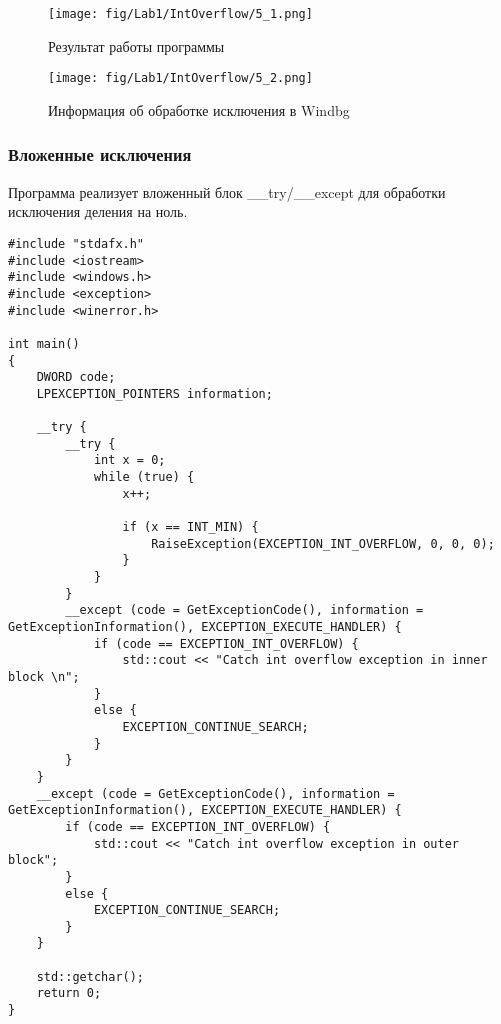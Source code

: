 \begin{figure}[H]
    \begin{center}
        \texttt{[image: fig/Lab1/IntOverflow/5\_1.png]}
        \caption{Результат работы программы}
        \label{pic:5_1}
    \end{center}
\end{figure}

\begin{figure}[H]
    \begin{center}
        \texttt{[image: fig/Lab1/IntOverflow/5\_2.png]}
        \caption{Информация об обработке исключения в Windbg}
        \label{pic:5_2}
    \end{center}
\end{figure}

\subsubsection{Вложенные исключения}
Программа реализует вложенный блок \_\_try/\_\_except для обработки исключения деления на ноль.

\begin{lstlisting}[caption=Вложенные исключения]
#include "stdafx.h"
#include <iostream>
#include <windows.h>
#include <exception>
#include <winerror.h>

int main()
{
    DWORD code;
    LPEXCEPTION_POINTERS information;

    __try {
        __try {
            int x = 0;
            while (true) {
                x++;

                if (x == INT_MIN) {
                    RaiseException(EXCEPTION_INT_OVERFLOW, 0, 0, 0);
                }
            }
        }
        __except (code = GetExceptionCode(), information = GetExceptionInformation(), EXCEPTION_EXECUTE_HANDLER) {
            if (code == EXCEPTION_INT_OVERFLOW) {
                std::cout << "Catch int overflow exception in inner block \n";
            }
            else {
                EXCEPTION_CONTINUE_SEARCH;
            }
        }
    }
    __except (code = GetExceptionCode(), information = GetExceptionInformation(), EXCEPTION_EXECUTE_HANDLER) {
        if (code == EXCEPTION_INT_OVERFLOW) {
            std::cout << "Catch int overflow exception in outer block";
        }
        else {
            EXCEPTION_CONTINUE_SEARCH;
        }
    }

    std::getchar();
    return 0;
}
\end{lstlisting}

